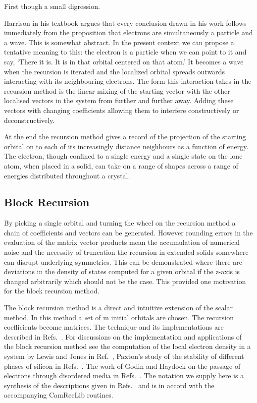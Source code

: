 First though a small digression.

Harrison in his textbook argues that every conclusion drawn in his work follows immediately
from the proposition that electrons are simultaneously a particle and a wave. This is
somewhat abstract. In the present context we can propose a tentative meaning to this:
the electron is a particle when we can point to it and say, `There it is. It is in that orbital
centered on that atom.' It becomes a wave when the recursion is iterated and the localized 
orbital spreads outwards interacting with its neighbouring electrons. 
The form this interaction takes in the recursion method is the linear mixing of the starting vector
with the other localised vectors in the system from further and further away. 
Adding these vectors with changing coefficients allowing them to interfere constructively or 
deconstructively. 

At the end the recursion method gives a record of the projection of 
the starting orbital on to each of its increasingly distance neighbours 
as a function of energy. The electron, though confined to a 
single energy and a single state on the lone atom, when placed in a solid, 
can take on a range of shapes across a range of energies distributed 
throughout a crystal.

\subsection{Block Recursion}
By picking a single orbital and turning the wheel on the recursion method a
chain of coefficients and vectors can be generated. However rounding errors in the evaluation
of the matrix vector products mean the accumulation of numerical noise
and the necessity of truncation the recursion in extended solids somewhere 
can disrupt underlying symmetries. This can be demonstrated where there are 
deviations in the density of states computed for a given orbital if the z-axis 
is changed arbitrarily which should not be the case. This provided one motivation for 
the block recursion method. 

The block recursion method is a direct and intuitive extension of the scalar method.
In this method a {\emph set of m} initial orbitals are chosen. The recursion
coefficients become matrices. The technique and its implementations are described 
in Refs.~\cite{jones84, legrand85, inoue87, nex89, godin91, ozaki00}. For discussions
on the implementation and applications of the block recursion method see
the computation of the local electron density in a system by 
Lewis and Jones in Ref.~\cite{jones84}, Paxton's study of the
stability of different phases of silicon in Refs.~\cite{paxton87, paxton88}. The work of 
Godin and Haydock on the passage of electrons through disordered media 
in Refs.~\cite{godin86, godin88}.
The notation we supply here is a synthesis of the descriptions given in
Refs.~\cite{paxton88, nex89, godin91} and is in accord with the accompanying CamRecLib
routines.


